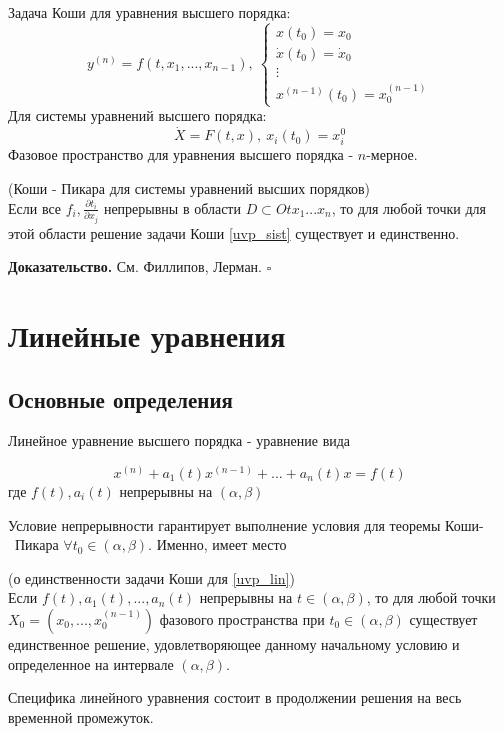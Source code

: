 Задача Коши для уравнения высшего порядка:
\begin{equation}
    y^{(n)} = f(t,x_1,...,x_{n-1}),~
    \begin{cases}
        x(t_{0})=x_0\\
        \dot x(t_0) = \dot x_0\\
        \vdots\\
        x^{(n-1)}(t_0)=x^{(n-1)}_0
    \end{cases}
\end{equation}
Для системы уравнений высшего порядка:
\begin{equation}\label{uvp_sist}
    \dot X = F(t,x),~x_i(t_0) = x^0_i
\end{equation}
Фазовое пространство для уравнения высшего порядка - $n$-мерное.
\begin{theor}
    (Коши - Пикара для системы уравнений высших порядков)\\
Если все $f_i,\frac{\partial t_i}{\partial x_j}$ непрерывны в области
$D\subset Otx_1...x_n$, то для любой точки для этой области решение 
задачи Коши \ref{uvp_sist} существует и единственно. 

\end{theor}
\textbf{Доказательство.}  См. Филлипов, Лерман.
$\square$ \\

\section{Линейные уравнения}
\subsection{Основные определения}
\begin{defin}
Линейное уравнение высшего порядка - уравнение вида

\begin{equation}\label{uvp_lin}
    x^{(n)}+a_1(t)x^{(n-1)}+...+a_n(t)x=f(t)
\end{equation}
где $f(t),a_i(t)$ непрерывны на  $(\alpha,\beta)$
\end{defin}
Условие непрерывности гарантирует выполнение условия для теоремы Коши-~Пикара
$\forall  t_0\in (\alpha,\beta)$. Именно, имеет место 
\begin{theor}
    (о единственности задачи Коши для \ref{uvp_lin})\\
    Если $f(t),a_1(t),...,a_n(t)$ непрерывны на  $t\in (\alpha,\beta)$,
    то для любой точки $X_0=(x_0,...,x^{(n-1)}_0)$
    фазового пространства при $t_0\in (\alpha,\beta)$
    существует единственное решение, удовлетворяющее данному начальному
    условию и определенное на интервале $ (\alpha,\beta)$.
\end{theor}
Специфика линейного уравнения состоит в продолжении решения на весь
временной промежуток.
